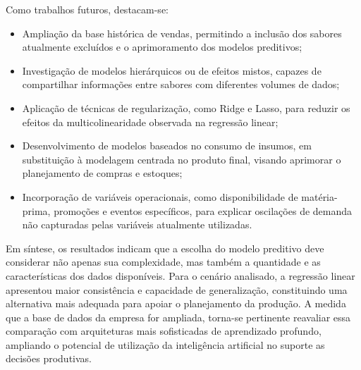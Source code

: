 Como trabalhos futuros, destacam-se:

\begin{itemize}
    \item Ampliação da base histórica de vendas, permitindo a inclusão dos sabores atualmente excluídos e o aprimoramento dos modelos preditivos;
    
    \item Investigação de modelos hierárquicos ou de efeitos mistos, capazes de compartilhar informações entre sabores com diferentes volumes de dados;
    
    \item Aplicação de técnicas de regularização, como Ridge e Lasso, para reduzir os efeitos da multicolinearidade observada na regressão linear;
    
    \item Desenvolvimento de modelos baseados no consumo de insumos, em substituição à modelagem centrada no produto final, visando aprimorar o planejamento de compras e estoques;
    
    \item Incorporação de variáveis operacionais, como disponibilidade de matéria-prima, promoções e eventos específicos, para explicar oscilações de demanda não capturadas pelas variáveis atualmente utilizadas.
\end{itemize}

Em síntese, os resultados indicam que a escolha do modelo preditivo deve considerar não apenas sua complexidade, mas também a quantidade e as características dos dados disponíveis. Para o cenário analisado, a regressão linear apresentou maior consistência e capacidade de generalização, constituindo uma alternativa mais adequada para apoiar o planejamento da produção. A medida que a base de dados da empresa for ampliada, torna-se pertinente reavaliar essa comparação com arquiteturas mais sofisticadas de aprendizado profundo, ampliando o potencial de utilização da inteligência artificial no suporte as decisões produtivas. 